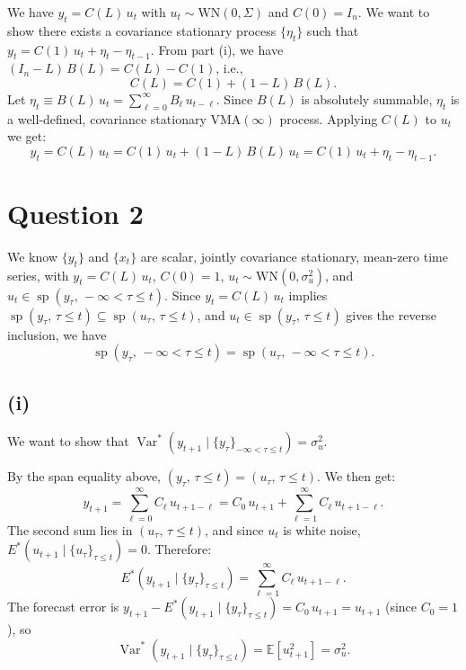 \documentclass[11pt]{article}
\newcommand{\Var}{\operatorname{Var}}
\newcommand{\E}{\mathbb{E}}
\begin{document}
We have $y_t = C(L)\,u_t$ with $u_t \sim \text{WN}(0,\Sigma)$ and $C(0)=I_n$. We want to show there exists a covariance stationary process $\{\eta_t\}$ such that $y_t = C(1)\,u_t + \eta_t - \eta_{t-1}$.
From part (i), we have $(I_n - L)\,B(L) = C(L) - C(1)$, i.e.,
\[
C(L) = C(1) + (1-L)\,B(L).
\]
Let $\eta_t \equiv B(L)\,u_t = \sum_{\ell=0}^{\infty} B_\ell\, u_{t-\ell}$. Since $B(L)$ is absolutely summable, $\eta_t$ is a well-defined, covariance stationary VMA$(\infty)$ process. Applying $C(L)$ to $u_t$ we get:
\[
y_t = C(L)\,u_t = C(1)\,u_t + (1-L)\,B(L)\,u_t = C(1)\,u_t + \eta_t - \eta_{t-1}.
\]

\section{Question 2}

We know $\{y_t\}$ and $\{x_t\}$ are scalar, jointly covariance stationary, mean-zero time series, with $y_t = C(L)\,u_t$, $C(0)=1$, $u_t \sim \text{WN}(0,\sigma_u^2)$, and $u_t \in \operatorname{sp}(y_\tau,\, -\infty < \tau \le t)$. Since $y_t = C(L)\,u_t$ implies $\operatorname{sp}(y_\tau,\,\tau\le t) \subseteq \operatorname{sp}(u_\tau,\,\tau\le t)$, and $u_t \in \operatorname{sp}(y_\tau,\,\tau\le t)$ gives the reverse inclusion, we have
\[
\operatorname{sp}(y_\tau,\,-\infty<\tau\le t) = \operatorname{sp}(u_\tau,\,-\infty<\tau\le t).
\]

\subsection{(i)}

We want to show that $\Var^*(y_{t+1} \mid \{y_\tau\}_{-\infty<\tau\le t}) = \sigma_u^2$.

By the span equality above, $(y_\tau,\,\tau\le t) = (u_\tau,\,\tau\le t)$. We then get:
\[
y_{t+1} = \sum_{\ell=0}^{\infty} C_\ell\, u_{t+1-\ell} = C_0\, u_{t+1} + \sum_{\ell=1}^{\infty} C_\ell\, u_{t+1-\ell}.
\]
The second sum lies in $(u_\tau,\,\tau \le t)$, and since $u_t$ is white noise, $E^*(u_{t+1} \mid \{u_\tau\}_{\tau\le t}) = 0$. Therefore:
\[
E^*(y_{t+1} \mid \{y_\tau\}_{\tau \le t}) = \sum_{\ell=1}^{\infty} C_\ell\, u_{t+1-\ell}.
\]
The forecast error is $y_{t+1} - E^*(y_{t+1} \mid \{y_\tau\}_{\tau\le t}) = C_0\, u_{t+1} = u_{t+1}$ (since $C_0=1$), so
\[
\Var^*(y_{t+1} \mid \{y_\tau\}_{\tau \le t}) = \E[u_{t+1}^2] = \sigma_u^2.
\]
\end{document}
